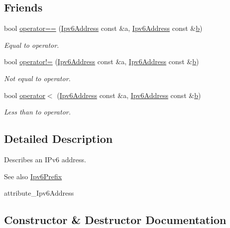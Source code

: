 \subsection*{Friends}
\begin{DoxyCompactItemize}
\item 
bool \hyperlink{classns3_1_1Ipv6Address_aa28b57690eea21fe8a2e571c57c773d7}{operator==} (\hyperlink{classns3_1_1Ipv6Address}{Ipv6\+Address} const \&a, \hyperlink{classns3_1_1Ipv6Address}{Ipv6\+Address} const \&\hyperlink{lte__pathloss_8m_a21ad0bd836b90d08f4cf640b4c298e7c}{b})
\begin{DoxyCompactList}\small\item\em Equal to operator. \end{DoxyCompactList}\item 
bool \hyperlink{classns3_1_1Ipv6Address_a7fbedd86635d00bcb8320869edc42c00}{operator!=} (\hyperlink{classns3_1_1Ipv6Address}{Ipv6\+Address} const \&a, \hyperlink{classns3_1_1Ipv6Address}{Ipv6\+Address} const \&\hyperlink{lte__pathloss_8m_a21ad0bd836b90d08f4cf640b4c298e7c}{b})
\begin{DoxyCompactList}\small\item\em Not equal to operator. \end{DoxyCompactList}\item 
bool \hyperlink{classns3_1_1Ipv6Address_aefbf622e471b833f6a1ea29831dbd335}{operator$<$} (\hyperlink{classns3_1_1Ipv6Address}{Ipv6\+Address} const \&a, \hyperlink{classns3_1_1Ipv6Address}{Ipv6\+Address} const \&\hyperlink{lte__pathloss_8m_a21ad0bd836b90d08f4cf640b4c298e7c}{b})
\begin{DoxyCompactList}\small\item\em Less than to operator. \end{DoxyCompactList}\end{DoxyCompactItemize}


\subsection{Detailed Description}
Describes an I\+Pv6 address. 

\begin{DoxySeeAlso}{See also}
\hyperlink{classns3_1_1Ipv6Prefix}{Ipv6\+Prefix} 

attribute\+\_\+\+Ipv6\+Address 
\end{DoxySeeAlso}


\subsection{Constructor \& Destructor Documentation}
